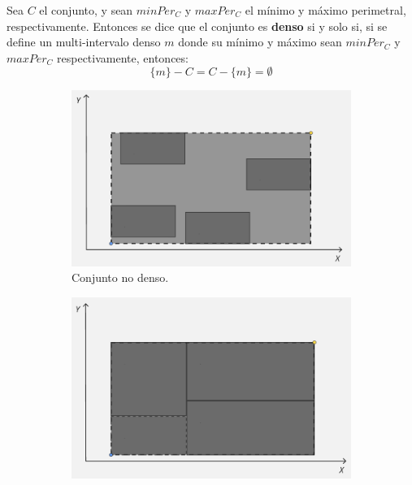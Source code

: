         \begin{center}
            Sea $C$ el conjunto, y sean $minPer_C$ y $maxPer_C$ el mínimo y máximo perimetral, respectivamente. Entonces se dice que el conjunto es \textbf{denso} si y solo si, si se define un multi-intervalo denso $m$ donde su mínimo y máximo sean $minPer_C$ y $maxPer_C$ respectivamente, entonces:
                \[
                    \{m\} - C = C - \{m\} = \emptyset
                \]
        \end{center}
\begin{figure}[h]
    \centering
    \begin{subfigure}[b]{0.42\linewidth}
        \centering
        \includegraphics[width=\linewidth]{figures/optimizaciones pwmap/op simils/denso1.png}
        \caption{Conjunto no denso.}
        \label{fig:crit-suma-dominio}
    \end{subfigure}
    \hfill
    \begin{subfigure}[b]{0.42\linewidth}
        \centering
        \includegraphics[width=\linewidth]{figures/optimizaciones pwmap/op simils/denso2.png}

\end{subfigure}
\end{figure}
